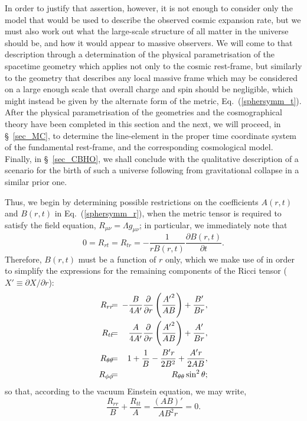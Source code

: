 In order to justify that assertion, however, it is not enough to consider only the model that would be used to describe the observed cosmic expansion rate, but we must also work out what the large-scale structure of all matter in the universe should be, and how it would appear to massive observers. We will come to that description through a determination of the physical parametrisation of the spacetime geometry which applies not only to the cosmic rest-frame, but similarly to the geometry that describes any local massive frame which may be considered on a large enough scale that overall charge and spin should be negligible, which might instead be given by the alternate form of the metric, Eq.~(\ref{sphersymm_t}). After the physical parametrisation of the geometries and the cosmographical theory have been completed in this section and the next, we will proceed, in \S~\ref{sec_MC}, to determine the line-element in the proper time coordinate system of the fundamental rest-frame, and the corresponding cosmological model. Finally, in \S~\ref{sec_CBHO}, we shall conclude with the qualitative description of a scenario for the birth of such a universe following from gravitational collapse in a similar prior one.

Thus, we begin by determining possible restrictions on the coefficients $A(r,t)$ and $B(r,t)$ in Eq.~(\ref{sphersymm_r}), when the metric tensor is required to satisfy the field equation, $R_{\mu\nu}=\Lambda{g}_{\mu\nu}$; in particular, we immediately note that
\begin{equation}
0=R_{rt}=R_{tr}=-\frac{1}{rB(r,t)}\frac{\partial{B(r,t)}}{\partial{t}}.\label{R_rt}
\end{equation} 
Therefore, $B(r,t)$ must be a function of $r$ only, which we make use of in order to simplify the expressions for the remaining components of the Ricci tensor ($X'\equiv\partial{X}/\partial{r}$):
\begin{eqnarray}
R_{rr}\!\!\!&=&\!\!\!-\frac{B}{4A'}\frac{\partial}{\partial{r}}\left(\frac{{A'}^2}{AB}\right)+\frac{B'}{Br},\label{R_rr}\\
R_{tt}\!\!\!&=&\!\!\!\frac{A}{4A'}\frac{\partial}{\partial{r}}\left(\frac{{A'}^2}{AB}\right)+\frac{A'}{Br},\label{R_tt}\\
R_{\theta\theta}\!\!\!&=&\!\!\!1+\frac{1}{B}-\frac{B'r}{2B^2}+\frac{A'r}{2AB},\label{R_thetatheta}\\
R_{\phi\phi}\!\!\!&=&\!\!\!{R_{\theta\theta}}\sin^2\theta; \label{R_{phiphi}}
\end{eqnarray}
so that, according to the vacuum Einstein equation, we may write,
\begin{equation}
\frac{R_{rr}}{B}+\frac{R_{tt}}{A}=\frac{(AB)'}{AB^2r}=0.
\end{equation}

